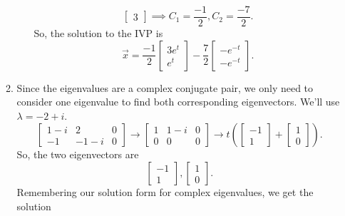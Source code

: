\begin{enumerate}[label=\arabic*.]
\begin{enumerate}[label=(\alph*)]
\begin{enumerate}[label=(\roman*)]
\begin{equation*}
\begin{bmatrix}
									3
								\end{bmatrix} \implies C_1 = \frac{-1}{2}, C_2 = \frac{-7}{2}.
							\end{equation*}
							So, the solution to the IVP is
							\begin{equation*}
								\vec{x} = \frac{-1}{2} \begin{bmatrix}
									3e^t \\
									e^t
								\end{bmatrix} - \frac{7}{2} \begin{bmatrix}
									-e^{-t} \\
									-e^{-t}
								\end{bmatrix}.
							\end{equation*}
					\end{enumerate}
				\item
					Since the eigenvalues are a complex conjugate pair, we only need to consider one eigenvalue to find both corresponding eigenvectors.
					We'll use $\lambda = -2 + i$.
					\begin{equation*}
						\left[
							\begin{array}{cc|c}
								1-i & 2 & 0 \\
								-1 & -1-i & 0
							\end{array}
						\right] \to \left[
							\begin{array}{cc|c}
								1 & 1-i & 0 \\
								0 & 0 & 0
							\end{array}
						\right] \to t\left(\begin{bmatrix}
							-1 \\
							1
						\end{bmatrix} + \begin{bmatrix}
							1 \\
							0
						\end{bmatrix}\right).
					\end{equation*}
					So, the two eigenvectors are
					\begin{equation*}
						\begin{bmatrix}
						-1 \\
						1
						\end{bmatrix}, \begin{bmatrix}
						1 \\
						0
						\end{bmatrix}.
					\end{equation*}
					Remembering our solution form for complex eigenvalues, we get the solution

\end{enumerate}
\end{enumerate}
